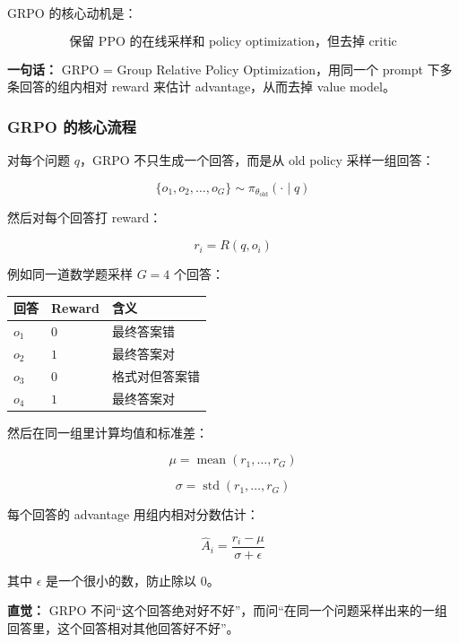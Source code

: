GRPO 的核心动机是：

\[
\text{保留 PPO 的在线采样和 policy optimization，但去掉 critic}
\]

\begin{summarybox}
\textbf{一句话：} GRPO = Group Relative Policy Optimization，用同一个 prompt 下多条回答的组内相对 reward 来估计 advantage，从而去掉 value model。
\end{summarybox}

\subsubsection{GRPO 的核心流程}

对每个问题 $q$，GRPO 不只生成一个回答，而是从 old policy 采样一组回答：

\[
\{o_1, o_2, \ldots, o_G\}
\sim
\pi_{\theta_\text{old}}(\cdot \mid q)
\]

然后对每个回答打 reward：

\[
r_i = R(q, o_i)
\]

例如同一道数学题采样 $G=4$ 个回答：

\begin{center}
{\small
\begin{tabular}{p{2.2cm}p{3.2cm}p{6.8cm}}
\hline
\textbf{回答} & \textbf{Reward} & \textbf{含义} \\
\hline
$o_1$ & $0$ & 最终答案错 \\
$o_2$ & $1$ & 最终答案对 \\
$o_3$ & $0$ & 格式对但答案错 \\
$o_4$ & $1$ & 最终答案对 \\
\hline
\end{tabular}
}
\end{center}

然后在同一组里计算均值和标准差：

\[
\mu = \operatorname{mean}(r_1,\ldots,r_G)
\]

\[
\sigma = \operatorname{std}(r_1,\ldots,r_G)
\]

每个回答的 advantage 用组内相对分数估计：

\[
\hat{A}_i
=
\frac{r_i - \mu}{\sigma + \epsilon}
\]

其中 $\epsilon$ 是一个很小的数，防止除以 $0$。

\begin{intubox}
\textbf{直觉：} GRPO 不问“这个回答绝对好不好”，而问“在同一个问题采样出来的一组回答里，这个回答相对其他回答好不好”。
\end{intubox}

